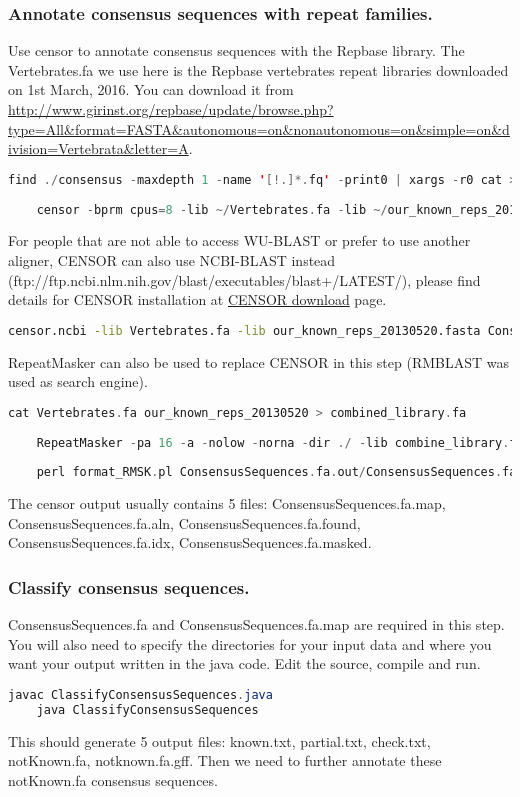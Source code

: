 \documentclass[a4paper,12pt]{article}
\begin{document}
	\subsubsection{Annotate consensus sequences with repeat families.}
	Use censor to annotate consensus sequences with the Repbase library. The Vertebrates.fa we use here is the Repbase vertebrates repeat libraries downloaded on 1st March, 2016. You can download it from \url{http://www.girinst.org/repbase/update/browse.php?type=All&format=FASTA&autonomous=on&nonautonomous=on&simple=on&division=Vertebrata&letter=A}.
	\begin{lstlisting}[language=scala]
	find ./consensus -maxdepth 1 -name '[!.]*.fq' -print0 | xargs -r0 cat > ConsensusSequences.fa
	
	censor -bprm cpus=8 -lib ~/Vertebrates.fa -lib ~/our_known_reps_20130520.fasta ConsensusSequences.fa  \end{lstlisting}
	For people that are not able to access WU-BLAST or prefer to use another aligner, CENSOR can also use NCBI-BLAST instead (ftp://ftp.ncbi.nlm.nih.gov/blast/executables/blast+/LATEST/), please find details for CENSOR installation at \href{http://www.girinst.org/downloads/software/censor/} {\color{blue}CENSOR download} page.
	\begin{lstlisting}[language=bash]
	censor.ncbi -lib Vertebrates.fa -lib our_known_reps_20130520.fasta ConsensusSequences.fa 
	\end{lstlisting}
	RepeatMasker can also be used to replace CENSOR in this step (RMBLAST was used as search engine).	
	\begin{lstlisting}[language=scala]
	cat Vertebrates.fa our_known_reps_20130520 > combined_library.fa
	
	RepeatMasker -pa 16 -a -nolow -norna -dir ./ -lib combine_library.fa ConsensusSequences.fa
	
	perl format_RMSK.pl ConsensusSequences.fa.out/ConsensusSequences.fa.ori.out > ConsensusSequences.fa.map \end{lstlisting}
	The censor output usually contains 5 files: ConsensusSequences.fa.map, ConsensusSequences.fa.aln, ConsensusSequences.fa.found, ConsensusSequences.fa.idx, ConsensusSequences.fa.masked. 
	
	\subsubsection{Classify consensus sequences.}
	ConsensusSequences.fa and ConsensusSequences.fa.map are required in this step. You will also need to specify the directories for your input data and where you want your output written in the java code. Edit the source, compile and run.\\
	\begin{lstlisting}[language=java]
	javac ClassifyConsensusSequences.java
	java ClassifyConsensusSequences \end{lstlisting}
	This should generate 5 output files: known.txt, partial.txt, check.txt, notKnown.fa, notknown.fa.gff. 
	Then we need to further annotate these notKnown.fa consensus sequences. 
	
\end{document}
